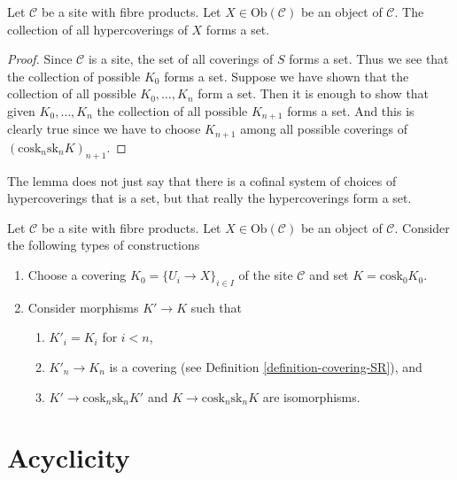 \begin{lemma}
\label{lemma-hypercoverings-set}
Let $\mathcal{C}$ be a site with fibre products.
Let $X \in \text{Ob}(\mathcal{C})$ be an object of $\mathcal{C}$.
The collection of all hypercoverings of $X$ forms a set.
\end{lemma}

\begin{proof}
Since $\mathcal{C}$ is a site, the set of all coverings of
$S$ forms a set. Thus we see that the collection
of possible $K_0$ forms a set. Suppose we have shown that
the collection of all possible $K_0, \ldots, K_n$ form
a set. Then it is enough to show that given
$K_0, \ldots, K_n$ the collection of all possible
$K_{n + 1}$ forms a set. And this is clearly true since
we have to choose $K_{n + 1}$ among all possible coverings
of $(\text{cosk}_n \text{sk}_n K)_{n + 1}$.
\end{proof}

\begin{remark}
\label{remark-hypercoverings-really-set}
The lemma does not just say that there is a cofinal
system of choices of hypercoverings that is a set,
but that really the hypercoverings form a set.
\end{remark}

\begin{lemma}
\label{lemma-structure-hypercovering}
Let $\mathcal{C}$ be a site with fibre products.
Let $X \in \text{Ob}(\mathcal{C})$ be an object of $\mathcal{C}$.
Consider the following types of constructions
\begin{enumerate}
\item Choose a covering $K_0 = \{U_i \to X\}_{i \in I}$
of the site $\mathcal{C}$ and set $K = \text{cosk}_0 K_0$.
\item Consider morphisms $K' \to K$ such that
\begin{enumerate}
\item $K'_i = K_i$ for $i < n$,
\item $K'_n \to K_n$ is a covering (see
Definition \ref{definition-covering-SR}), and
\item $K' \to \text{cosk}_n \text{sk}_n K'$ and 
$K \to \text{cosk}_n \text{sk}_n K$ are isomorphisms.
\end{enumerate}
\end{enumerate}
\end{lemma}






\section{Acyclicity}
\label{section-acyclicity}

